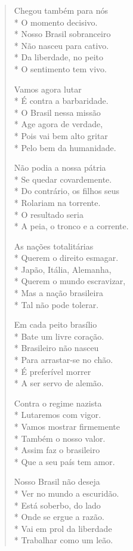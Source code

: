\begin{verse}
Chegou também para nós\\*
O momento decisivo.\\*
Nosso Brasil sobranceiro\\*
Não nasceu para cativo.\\*
Da liberdade, no peito\\*
O sentimento tem vivo.

Vamos agora lutar\\*
É contra a barbaridade.\\*
O Brasil nessa missão\\*
Age agora de verdade,\\*
Pois vai bem alto gritar\\*
Pelo bem da humanidade.

Não podia a nossa pátria\\*
Se quedar covardemente.\\*
Do contrário, os filhos seus\\*
Rolariam na torrente.\\*
O resultado seria\\*
A peia, o tronco e a corrente.

As nações totalitárias\\*
Querem o direito esmagar.\\*
Japão, Itália, Alemanha,\\*
Querem o mundo escravizar,\\*
Mas a nação brasileira\\*
Tal não pode tolerar.

Em cada peito brasílio\\*
Bate um livre coração.\\*
Brasileiro não nasceu\\*
Para arrastar-se no chão.\\*
É preferível morrer\\*
A ser servo de alemão.

Contra o regime nazista\\*
Lutaremos com vigor.\\*
Vamos mostrar firmemente\\*
Também o nosso valor.\\*
Assim faz o brasileiro\\*
Que a seu país tem amor.

Nosso Brasil não deseja\\*
Ver no mundo a escuridão.\\*
Está soberbo, do lado\\*
Onde se ergue a razão.\\*
Vai em prol da liberdade\\*
Trabalhar como um leão.


\end{verse}
